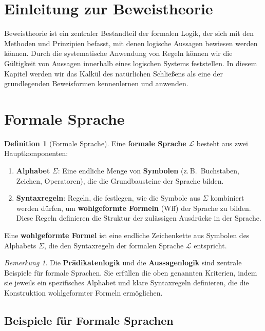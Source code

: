 \documentclass{book}
\theoremstyle{plain}
\theoremstyle{remark}
\newtheorem*{remark}{Bemerkung}
\theoremstyle{definition}
\newtheorem{definition}{Definition}[section]
\begin{document}
\section{Einleitung zur Beweistheorie}
Beweistheorie ist ein zentraler Bestandteil der formalen Logik, der sich mit den Methoden und Prinzipien befasst, mit denen logische Aussagen bewiesen werden können. Durch die systematische Anwendung von Regeln können wir die Gültigkeit von Aussagen innerhalb eines logischen Systems feststellen. In diesem Kapitel werden wir das Kalkül des natürlichen Schließens als eine der grundlegenden Beweisformen kennenlernen und anwenden.

\section{Formale Sprache}

\begin{definition}[Formale Sprache]
Eine \textbf{formale Sprache} \(\mathcal{L}\) besteht aus zwei Hauptkomponenten:

\begin{enumerate}
    \item \textbf{Alphabet} \( \Sigma \): Eine endliche Menge von \textbf{Symbolen} (z.\,B.\ Buchstaben, Zeichen, Operatoren), die die Grundbausteine der Sprache bilden.
    \item \textbf{Syntaxregeln}: Regeln, die festlegen, wie die Symbole aus \( \Sigma \) kombiniert werden dürfen, um \textbf{wohlgeformte Formeln} (Wff) der Sprache zu bilden. Diese Regeln definieren die Struktur der zulässigen Ausdrücke in der Sprache.
\end{enumerate}

Eine \textbf{wohlgeformte Formel} ist eine endliche Zeichenkette aus Symbolen des Alphabets \( \Sigma \), die den Syntaxregeln der formalen Sprache \(\mathcal{L}\) entspricht.
\end{definition}

\begin{remark}
Die \textbf{Prädikatenlogik} und die \textbf{Aussagenlogik} sind zentrale Beispiele für formale Sprachen. Sie erfüllen die oben genannten Kriterien, indem sie jeweils ein spezifisches Alphabet und klare Syntaxregeln definieren, die die Konstruktion wohlgeformter Formeln ermöglichen.
\end{remark}

\subsection{Beispiele für Formale Sprachen}
\end{document}
